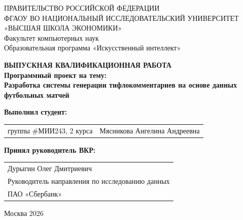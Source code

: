 \begin{titlepage}
\newpage

{
\begin{center}
ПРАВИТЕЛЬСТВО РОССИЙСКОЙ ФЕДЕРАЦИИ\\
ФГАОУ ВО НАЦИОНАЛЬНЫЙ ИССЛЕДОВАТЕЛЬСКИЙ УНИВЕРСИТЕТ\\
«ВЫСШАЯ ШКОЛА ЭКОНОМИКИ»
\\
\bigskip
Факультет компьютерных наук\\
Образовательная программа «Искусственный интеллект»
\end{center}
}

\vspace{7em}

\begin{center}
{\bf ВЫПУСКНАЯ КВАЛИФИКАЦИОННАЯ РАБОТА}\\
{\bf Программный проект на тему:}\\
{\bf Разработка системы генерации тифлокомментариев на основе данных футбольных матчей}\\
\end{center}

\vspace{2em}

{\bf Выполнил студент: \vspace{2mm}}

{
\begin{tabular}{l@{\hskip 1.5cm}l}
группы \#МИИ243, 2 курса & Мясникова Ангелина Андреевна
\end{tabular}}

\vspace{1em}
{\bf Принял руководитель ВКР: \vspace{2mm}}

{
\begin{tabular}{@{}p{}@{}}
Дурыгин Олег Дмитриевич\\
Руководитель направления по исследованию данных\\
ПАО «Сбербанк»
\end{tabular}}


\vspace{\fill}

\begin{center}
Москва 2026
\end{center}

\end{titlepage}
